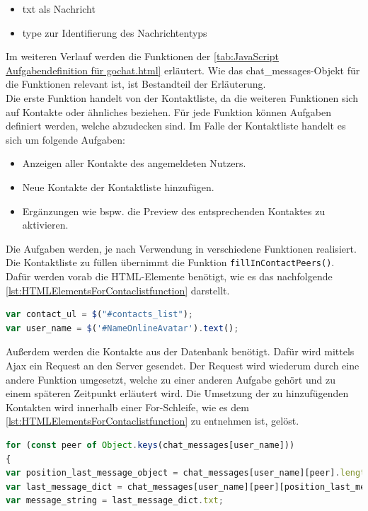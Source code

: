 \documentclass[a4paper,titlepage,halfparskip,12pt]{scrreprt}
\begin{document}
\begin{onehalfspacing}
\begin{itemize}
	\item txt als Nachricht
	\item type zur Identifierung des Nachrichtentyps
\end{itemize}
Im weiteren Verlauf werden die Funktionen der \autoref{tab:JavaScript Aufgabendefinition für gochat.html} erläutert. Wie das chat\_messages-Objekt für die Funktionen relevant ist, ist Bestandteil der Erläuterung.\\
Die erste Funktion handelt von der Kontaktliste, da die weiteren Funktionen sich auf Kontakte oder ähnliches beziehen. Für jede Funktion können Aufgaben definiert werden, welche abzudecken sind. Im Falle der Kontaktliste handelt es sich um folgende Aufgaben:
\begin{itemize}
	\item Anzeigen aller Kontakte des angemeldeten Nutzers.
	\item Neue Kontakte der Kontaktliste hinzufügen.
	\item Ergänzungen wie bspw. die Preview des entsprechenden Kontaktes zu aktivieren.
\end{itemize}
Die Aufgaben werden, je nach Verwendung in verschiedene Funktionen realisiert. Die Kontaktliste zu füllen übernimmt die Funktion \texttt{fillInContactPeers()}. Dafür werden vorab die \ac{HTML}-Elemente benötigt, wie es das nachfolgende \autoref{lst:HTMLElementsForContaclistfunction} darstellt.
\begin{lstlisting}[language=Javascript,caption=HTML Elemente für \texttt{fillInContactPeers()},label={lst:HTMLElementsForContaclistfunction}]
var contact_ul = $("#contacts_list");
var user_name = $('#NameOnlineAvatar').text();
\end{lstlisting}
Außerdem werden die Kontakte aus der Datenbank benötigt. Dafür wird mittels Ajax ein Request an den Server gesendet. Der Request wird wiederum durch eine andere Funktion umgesetzt, welche zu einer anderen Aufgabe gehört und zu einem späteren Zeitpunkt erläutert wird. Die Umsetzung der zu hinzufügenden Kontakten wird innerhalb einer For-Schleife, wie es dem \autoref{lst:HTMLElementsForContaclistfunction} zu entnehmen ist, gelöst.
\begin{lstlisting}[language=Javascript,caption=Hinzufügen von Kontakten,label={lst:HTMLElementsForContaclistfunction}]
for (const peer of Object.keys(chat_messages[user_name]))
{
var position_last_message_object = chat_messages[user_name][peer].length - 1;
var last_message_dict = chat_messages[user_name][peer][position_last_message_object];
var message_string = last_message_dict.txt;

\end{lstlisting}
\end{onehalfspacing}
\end{document}
